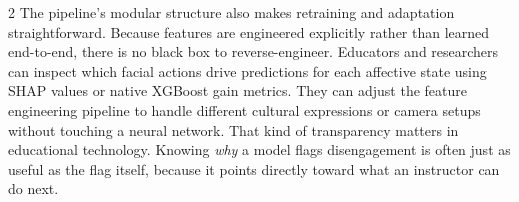 \begin{multicols}{2}
  The pipeline's modular structure also makes retraining and adaptation straightforward. Because features are engineered explicitly rather than learned end-to-end, there is no black box to reverse-engineer. Educators and researchers can inspect which facial actions drive predictions for each affective state using SHAP values or native XGBoost gain metrics. They can adjust the feature engineering pipeline to handle different cultural expressions or camera setups without touching a neural network. That kind of transparency matters in educational technology. Knowing \textit{why} a model flags disengagement is often just as useful as the flag itself, because it points directly toward what an instructor can do next.

\end{multicols}

